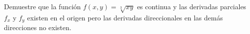 \item Demuestre que la función $f(x, y) = \sqrt[3]{xy}$ es continua y las derivadas parciales $f_x$ y $f_y$ existen en el origen pero las derivadas direccionales en las demás direcciones no existen.
